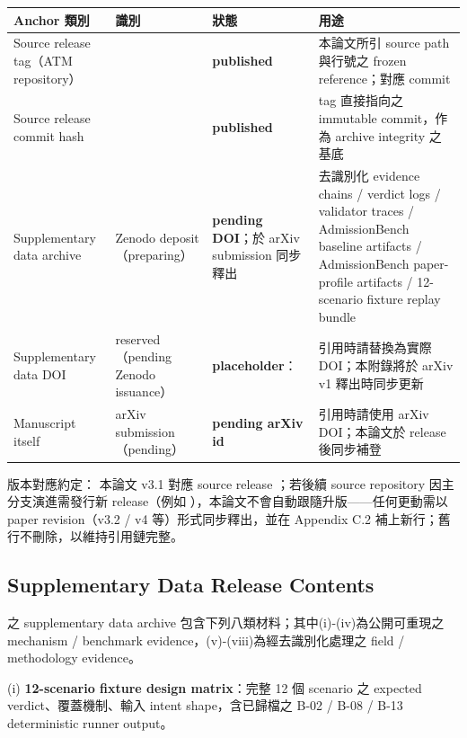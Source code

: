 \documentclass[a4paper,fontset=none]{ctexart}
\begin{document}
\begingroup
\footnotesize
{}
\begin{longtable}{L{0.23\textwidth}L{0.23\textwidth}L{0.23\textwidth}L{0.23\textwidth}}
\toprule
Anchor 類別 & 識別 & 狀態 & 用途 \\
\midrule
Source release tag（ATM repository） & \texttt{} & \textbf{published} & 本論文所引 source path 與行號之 frozen reference；對應 commit \texttt{} \\
Source release commit hash & \texttt{} & \textbf{published} & tag 直接指向之 immutable commit，作為 archive integrity 之基底 \\
Supplementary data archive & Zenodo deposit（preparing） & \textbf{pending DOI}；於 arXiv submission 同步釋出 & 去識別化 evidence chains / verdict logs / validator traces / AdmissionBench baseline artifacts / AdmissionBench paper-profile artifacts / 12-scenario fixture replay bundle \\
Supplementary data DOI & reserved（pending Zenodo issuance） & \textbf{placeholder}：\texttt{} & 引用時請替換為實際 DOI；本附錄將於 arXiv v1 釋出時同步更新 \\
Manuscript itself & arXiv submission（pending） & \textbf{pending arXiv id} & 引用時請使用 arXiv DOI；本論文於 release 後同步補登 \\
\bottomrule
\end{longtable}
\endgroup

版本對應約定： 本論文 v3.1 對應 source release \texttt{}；若後續 source repository 因主分支演進需發行新 release（例如 \texttt{}），本論文不會自動跟隨升版------任何更動需以 paper revision（v3.2 / v4 等）形式同步釋出，並在 Appendix C.2 補上新行；舊行不刪除，以維持引用鏈完整。

\subsection*{Supplementary Data Release Contents}

\texttt{} 之 supplementary data archive 包含下列八類材料；其中(i)-(iv)為公開可重現之 mechanism / benchmark evidence，(v)-(viii)為經去識別化處理之 field / methodology evidence。

(i) \textbf{12-scenario fixture design matrix}：完整 12 個 scenario 之 expected verdict、覆蓋機制、輸入 intent shape，含已歸檔之 B-02 / B-08 / B-13 deterministic runner output。
\end{document}
